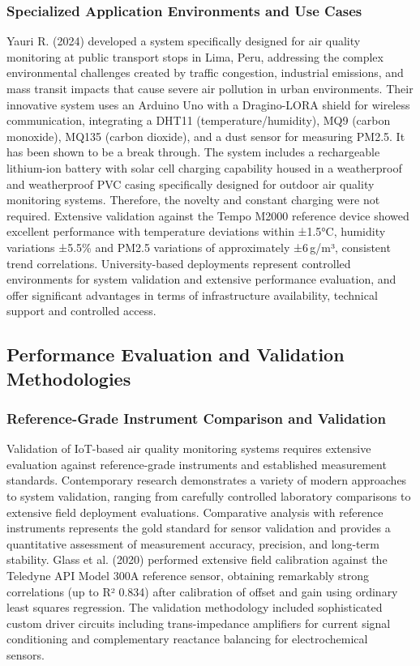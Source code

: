 \documentclass[conference]{IEEEtran}
\begin{document}
\subsubsection{Specialized Application Environments and Use Cases}
Yauri R. (2024) developed a system specifically designed for air quality monitoring at public transport stops in Lima, Peru, addressing the complex environmental challenges created by traffic congestion, industrial emissions, and mass transit impacts that cause severe air pollution in urban environments. Their innovative system uses an Arduino Uno with a Dragino-LORA shield for wireless communication, integrating a DHT11 (temperature/humidity), MQ9 (carbon monoxide), MQ135 (carbon dioxide), and a dust sensor for measuring PM2.5. It has been shown to be a break through. The system includes a rechargeable lithium-ion battery with solar cell charging capability housed in a weatherproof and weatherproof PVC casing specifically designed for outdoor air quality monitoring systems. Therefore, the novelty and constant charging were not required. Extensive validation against the Tempo M2000 reference device showed excellent performance with temperature deviations within ±1.5°C, humidity variations ±5.5\% and PM2.5 variations of approximately ±6\,\textmu g/m³, consistent trend correlations. University-based deployments represent controlled environments for system validation and extensive performance evaluation, and offer significant advantages in terms of infrastructure availability, technical support and controlled access.~\cite{yauri2024}

\subsection{Performance Evaluation and Validation Methodologies}
\subsubsection{Reference-Grade Instrument Comparison and Validation}
Validation of IoT-based air quality monitoring systems requires extensive evaluation against reference-grade instruments and established measurement standards. Contemporary research demonstrates a variety of modern approaches to system validation, ranging from carefully controlled laboratory comparisons to extensive field deployment evaluations. Comparative analysis with reference instruments represents the gold standard for sensor validation and provides a quantitative assessment of measurement accuracy, precision, and long-term stability. Glass et al. (2020) performed extensive field calibration against the Teledyne API Model 300A reference sensor, obtaining remarkably strong correlations (up to R² 0.834) after calibration of offset and gain using ordinary least squares regression. The validation methodology included sophisticated custom driver circuits including trans-impedance amplifiers for current signal conditioning and complementary reactance balancing for electrochemical sensors.~\cite{glass2020}
\end{document}
